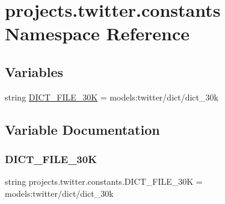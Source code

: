\hypertarget{namespaceprojects_1_1twitter_1_1constants}{}\section{projects.\+twitter.\+constants Namespace Reference}
\label{namespaceprojects_1_1twitter_1_1constants}
\subsection*{Variables}
\begin{DoxyCompactItemize}
\item 
string \hyperlink{namespaceprojects_1_1twitter_1_1constants_a36d5f10384a41798fa3b5721e90af4ec}{D\+I\+C\+T\+\_\+\+F\+I\+L\+E\+\_\+30K} = \textquotesingle{}models\+:twitter/dict/dict\+\_\+30k\textquotesingle{}
\end{DoxyCompactItemize}


\subsection{Variable Documentation}
\mbox{\label{namespaceprojects_1_1twitter_1_1constants_a36d5f10384a41798fa3b5721e90af4ec}} 
\subsubsection{\texorpdfstring{D\+I\+C\+T\+\_\+\+F\+I\+L\+E\+\_\+30K}{DICT\_FILE\_30K}}
{\footnotesize\ttfamily string projects.\+twitter.\+constants.\+D\+I\+C\+T\+\_\+\+F\+I\+L\+E\+\_\+30K = \textquotesingle{}models\+:twitter/dict/dict\+\_\+30k\textquotesingle{}}

